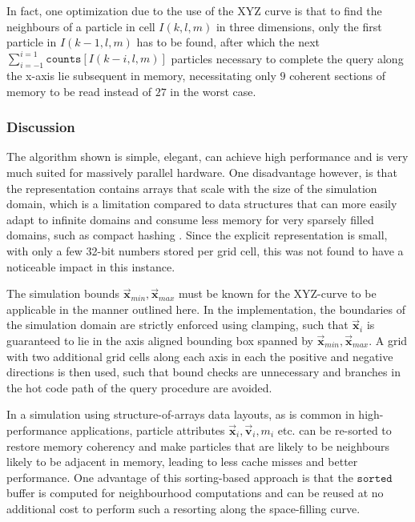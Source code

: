\documentclass[oneside, a4paper]{book}
\newcommand\vek[1]{\vec{\bm{#1}}}
\begin{document}
\begin{appendices}
    In fact, one optimization due to the use of the XYZ curve is that to find the neighbours of a particle in cell $I(k,l,m)$ in three dimensions, only the first particle in $I(k-1, l, m)$ has to be found, after which the next $\sum_{i=-1}^{i=1}\texttt{counts}[I(k-i,l,m)]$ particles necessary to complete the query along the x-axis lie subsequent in memory, necessitating only $9$ coherent sections of memory to be read instead of $27$ in the worst case.

    \subsubsection{Discussion}
    The algorithm shown \autocite{hoetzlein-rama-counting-sort} is simple, elegant, can achieve high performance and is very much suited for massively parallel hardware. One disadvantage however, is that the representation contains arrays that scale with the size of the simulation domain, which is a limitation compared to data structures that can more easily adapt to infinite domains and consume less memory for very sparsely filled domains, such as compact hashing \autocites{tutorial2019}{compressed-neighbour-lists}. Since the explicit representation is small, with only a few 32-bit numbers stored per grid cell, this was not found to have a noticeable impact in this instance.

    The simulation bounds $\vek{x}_{min},\vek{x}_{max}$ must be known for the XYZ-curve to be applicable in the manner outlined here. In the implementation, the boundaries of the simulation domain are strictly enforced using clamping, such that $\vek{x}_i$ is guaranteed to lie in the axis aligned bounding box spanned by $\vek{x}_{min},\vek{x}_{max}$. A grid with two additional grid cells along each axis in each the positive and negative directions is then used, such that bound checks are unnecessary and branches in the hot code path of the query procedure are avoided.
    
    In a simulation using structure-of-arrays data layouts, as is common in high-performance applications, particle attributes $\vek{x}_i, \vek{v}_i, m_i$ etc. can be re-sorted to restore memory coherency and make particles that are likely to be neighbours likely to be adjacent in memory, leading to less cache misses and better performance. One advantage of this sorting-based approach is that the $\texttt{sorted}$ buffer is computed for neighbourhood computations and can be reused at no additional cost to perform such a resorting along the space-filling curve.


\end{appendices}
\end{document}
